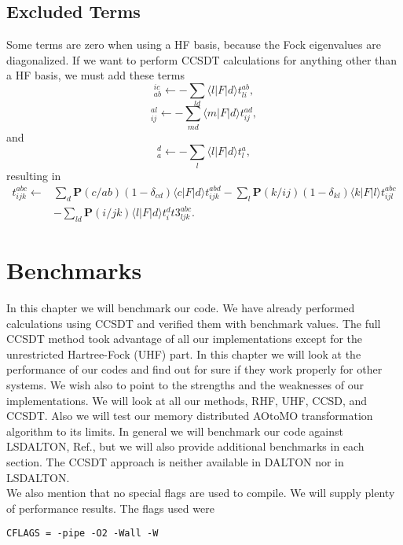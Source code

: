 \section{Excluded Terms}
Some terms are zero when using a HF basis, because the Fock
eigenvalues are diagonalized. If we want to perform CCSDT calculations
for anything other than a HF basis, we must add these terms
\begin{equation}
[X1]_{ab}^{ic} \leftarrow - \sum_{ld} \langle l | F | d \rangle t_{li}^{ab},
\end{equation}
\begin{equation}
[X15]_{ij}^{al} \leftarrow - \sum_{md} \langle m | F | d \rangle t_{ij}^{ad},
\end{equation}
and
\begin{equation}
[X8]_a^d \leftarrow - \sum_l \langle l | F | d \rangle t_l^a,
\end{equation}
resulting in
\begin{align}
t_{ijk}^{abc} \leftarrow &
\sum_d \textbf{P}(c/ab)
(1 - \delta_{cd}) \langle c | F | d \rangle t_{ijk}^{abd}
- \sum_l \textbf{P}(k/ij) 
(1 - \delta_{kl}) \langle k | F | l \rangle  t_{ijl}^{abc}
\nonumber \\ &
-
\sum_{ld}
\textbf{P}(i/jk)
\langle l | F | d \rangle t_i^d  t3^{abc}_{ljk} .
\end{align}


\chapter{Benchmarks}
In this chapter we will benchmark our code. We have already performed
calculations using CCSDT and verified them with benchmark values. The
full CCSDT method took advantage of all our implementations except for
the unrestricted Hartree-Fock (UHF) part. In this chapter we will look at the performance of our codes
and find out for sure if they work properly for other systems. We wish also to point to 
the strengths and the weaknesses of our implementations. We
will look at all our methods, RHF, UHF, CCSD, and CCSDT. Also we will
test our memory distributed AOtoMO transformation algorithm to its
limits. In general we will benchmark our code against LSDALTON,
Ref.\cite{LSDALTON_CITATION}, but we will also provide additional
benchmarks in each section. The CCSDT approach is neither available in DALTON nor
in LSDALTON. \\

We also mention that no special flags are used to compile. We will supply plenty of performance results. The flags used were 
\begin{lstlisting}
CFLAGS = -pipe -O2 -Wall -W 
\end{lstlisting}

